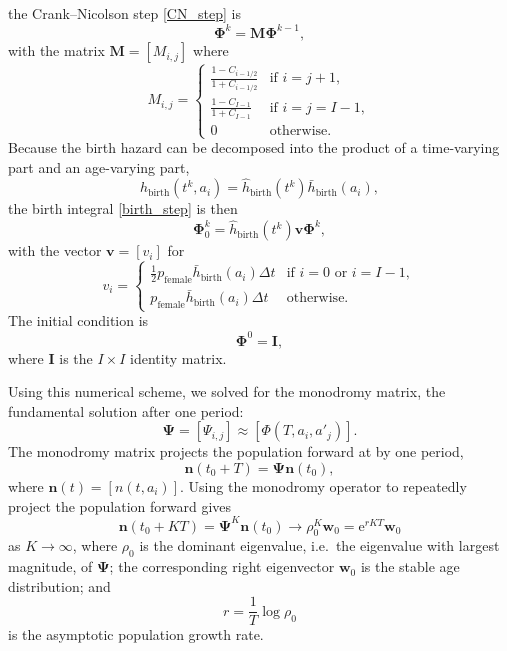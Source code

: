 \documentclass[12pt]{article}
\renewcommand{\vec}[1]{\mathbf{#1}}
\newcommand{\mat}[1]{\mathbf{#1}}
\newcommand{\me}{\mathrm{e}}
\begin{document}
the Crank--Nicolson step \eqref{CN_step} is
\begin{equation}
  \mat{\Phi}^k = \mat{M} \mat{\Phi}^{k - 1},
\end{equation}
with the matrix $\mat{M} = [M_{i, j}]$ where
\begin{equation}
  M_{i, j} =
  \begin{cases}
    \frac{1 - C_{i - 1 / 2}}{1 + C_{i - 1 / 2}}
    & \text{if $i = j + 1$}, \\
    \frac{1 - C_{I - 1}}{1 + C_{I - 1}} & \text{if $i = j = I - 1$}, \\
    0 & \text{otherwise}.
  \end{cases}
\end{equation}
Because the birth hazard can be decomposed into the product of a
time-varying part and an age-varying part,
\begin{equation}
  h_{\text{birth}}(t^k, a_i)
  = \hat{h}_{\text{birth}}(t^k) \bar{h}_{\text{birth}}(a_i),
\end{equation}
the birth integral \eqref{birth_step} is then
\begin{equation}
  \mat{\Phi}_0^k = \hat{h}_{\text{birth}}(t^k) \vec{v} \mat{\Phi}^k,
\end{equation}
with the vector $\vec{v} = [v_i]$ for
\begin{equation}
  v_i =
  \begin{cases}
    \frac{1}{2} p_{\text{female}} \bar{h}_{\text{birth}}(a_i) \Delta t
    & \text{if $i = 0$ or $i = I - 1$}, \\
    p_{\text{female}} \bar{h}_{\text{birth}}(a_i) \Delta t
    & \text{otherwise}.
  \end{cases}
\end{equation}
The initial condition is
\begin{equation}
  \mat{\Phi}^0 = \mat{I},
\end{equation}
where $\mat{I}$ is the $I \times I$ identity matrix.

Using this numerical scheme, we solved for the monodromy matrix, the
fundamental solution after one period:
\begin{equation}
  \mat{\Psi} = [\Psi_{i, j}] \approx [\Phi(T, a_i, a'_j)].
\end{equation}
The monodromy matrix projects the population forward at by one period,
\begin{equation}
  \vec{n}(t_0 + T) = \mat{\Psi} \vec{n}(t_0),
\end{equation}
where $\vec{n}(t) = [n(t, a_i)]$.
Using the monodromy operator to repeatedly project the population
forward gives
\begin{equation}
  \vec{n}(t_0 + K T)
  = \mat{\Psi}^K \vec{n}(t_0)
  \to \rho_0^K \vec{w}_0
  = \me^{r K T} \vec{w}_0
\end{equation}
as $K \to \infty$,
where $\rho_0$ is the dominant eigenvalue, i.e.~the eigenvalue with
largest magnitude, of $\mat{\Psi}$;
the corresponding right eigenvector $\vec{w}_0$ is the stable age
distribution; and
\begin{equation}
  r = \frac{1}{T} \log \rho_0
\end{equation}
is the asymptotic population growth rate.
\end{document}
